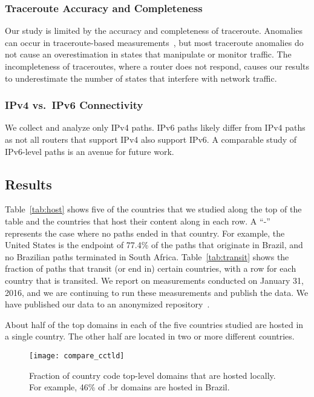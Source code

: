 \subsubsection{Traceroute Accuracy and Completeness}
Our study is limited by the accuracy and completeness of traceroute.
Anomalies can occur in traceroute-based
measurements~\cite{augustin2006avoiding}, but most traceroute anomalies
do not cause an overestimation in states that manipulate or monitor traffic.  The
incompleteness of traceroutes, where a router does not respond, causes
our results to underestimate the number of states that interfere with network 
traffic.

\subsubsection{IPv4 vs.\ IPv6 Connectivity}
We collect and analyze only IPv4 paths.  IPv6 paths likely
differ from IPv4 paths as not all routers that support IPv4 also support
IPv6.  A comparable study of IPv6-level paths is an avenue for future work.

\subsection{Results}



Table~\ref{tab:host} shows five of the countries that we studied along the top
of the table and the countries that host their content along in each row.  A
``-'' represents the case where no paths ended in that country. For example,
the United States is the endpoint of 77.4\% of the paths that originate in
Brazil, and no Brazilian paths terminated in South Africa.
Table~\ref{tab:transit} shows the fraction of paths that transit (or end in)
certain countries, with a row for each country that is transited.  We report 
on measurements conducted on January 31, 2016, and we are continuing to run 
these measurements and publish the data.  We have published our data 
to an anonymized repository~\cite{ransom_data}.

\begin{finding} About half of the top domains in each of
the five countries studied are hosted in a single country.  The other half are
located in two or more different countries. \end{finding} 

\begin{figure}[b]
\centering
\texttt{[image: compare\_cctld]}
\caption{Fraction of country code top-level domains that are hosted locally. For example, 46\% of .br domains are hosted in Brazil.}
\label{fig:cctld_graph}
\end{figure}

